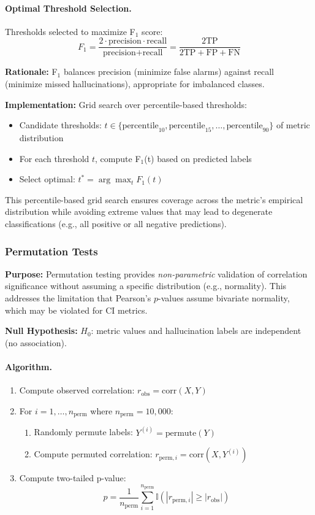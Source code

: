 \paragraph{Optimal Threshold Selection.} Thresholds selected to maximize F\(_1\) score:
\[
F_1 = \frac{2 \cdot \text{precision} \cdot \text{recall}}{\text{precision} + \text{recall}} = \frac{2\text{TP}}{2\text{TP} + \text{FP} + \text{FN}}
\]

\textbf{Rationale:} F\(_1\) balances precision (minimize false alarms) against recall (minimize missed hallucinations), appropriate for imbalanced classes.

\textbf{Implementation:} Grid search over percentile-based thresholds:
\begin{itemize}
    \item Candidate thresholds: \(t \in \{\text{percentile}_{10}, \text{percentile}_{15}, \ldots, \text{percentile}_{90}\}\) of metric distribution
    \item For each threshold \(t\), compute F\(_1\)(t) based on predicted labels
    \item Select optimal: \(t^* = \arg\max_t F_1(t)\)
\end{itemize}

This percentile-based grid search ensures coverage across the metric's empirical distribution while avoiding extreme values that may lead to degenerate classifications (e.g., all positive or all negative predictions).

\subsubsection{Permutation Tests}

\textbf{Purpose:} Permutation testing provides \textit{non-parametric} validation of correlation significance without assuming a specific distribution (e.g., normality). This addresses the limitation that Pearson's \(p\)-values assume bivariate normality, which may be violated for CI metrics.

\textbf{Null Hypothesis:} \(H_0\): metric values and hallucination labels are independent (no association).

\paragraph{Algorithm.}
\begin{enumerate}
    \item Compute observed correlation: \(r_{\text{obs}} = \text{corr}(X, Y)\)
    \item For \(i = 1, \ldots, n_{\text{perm}}\) where \(n_{\text{perm}} = 10{,}000\):
    \begin{enumerate}
        \item Randomly permute labels: \(Y^{(i)} = \text{permute}(Y)\)
        \item Compute permuted correlation: \(r_{\text{perm},i} = \text{corr}(X, Y^{(i)})\)
    \end{enumerate}
    \item Compute two-tailed p-value:
    \[
    p = \frac{1}{n_{\text{perm}}}\sum_{i=1}^{n_{\text{perm}}} \mathbb{I}(|r_{\text{perm},i}| \geq |r_{\text{obs}}|)
    \]
\end{enumerate}


